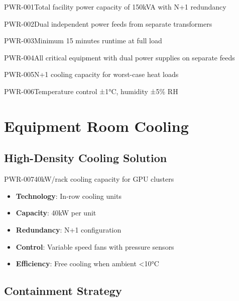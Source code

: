\begin{requirement}{PWR-001}{Total facility power capacity of 150kVA with N+1 redundancy}
\begin{requirement}{PWR-002}{Dual independent power feeds from separate transformers}
\begin{requirement}{PWR-003}{Minimum 15 minutes runtime at full load}
\begin{requirement}{PWR-004}{All critical equipment with dual power supplies on separate feeds}
\begin{requirement}{PWR-005}{N+1 cooling capacity for worst-case heat loads}
\begin{requirement}{PWR-006}{Temperature control ±1°C, humidity ±5\% RH}
\section{Equipment Room Cooling}

\subsection{High-Density Cooling Solution}

\begin{requirement}{PWR-007}{40kW/rack cooling capacity for GPU clusters}

\begin{itemize}
    \item \textbf{Technology}: In-row cooling units
    \item \textbf{Capacity}: 40kW per unit
    \item \textbf{Redundancy}: N+1 configuration
    \item \textbf{Control}: Variable speed fans with pressure sensors
    \item \textbf{Efficiency}: Free cooling when ambient <10°C
\end{itemize}

\subsection{Containment Strategy}

\begin{figure}[H]
\centering
{}
\end{figure}
\end{requirement}
\end{requirement}
\end{requirement}
\end{requirement}
\end{requirement}
\end{requirement}
\end{requirement}
